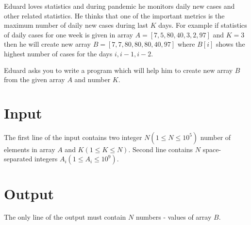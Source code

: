 
Eduard loves statistics and during pandemic he monitors daily new cases and other related statistics. He thinks that one of the important metrics is the maximum number of daily new cases during last $K$ days. For example if statistics of daily cases for one week is given in array $A = [7, 5, 80, 40, 3, 2, 97]$ and $K=3$ then he will create new array $B = [7, 7, 80, 80, 80, 40, 97]$ where $B[i]$ shows the highest number of cases for the days $i, i - 1, i - 2$.

Eduard asks you to write a program which will help him to create new array $B$ from the given array $A$ and number $K$.

\section*{Input}
The first line of the input contains two integer $N (1 \leq N \leq 10^5)$ number of elements in array $A$ and $K (1 \leq K \leq N)$.
Second line contains $N$ space-separated integers $A_i (1 \leq A_i \leq 10^9)$.

\section*{Output}
The only line of the output must contain $N$ numbers - values of array $B$.
